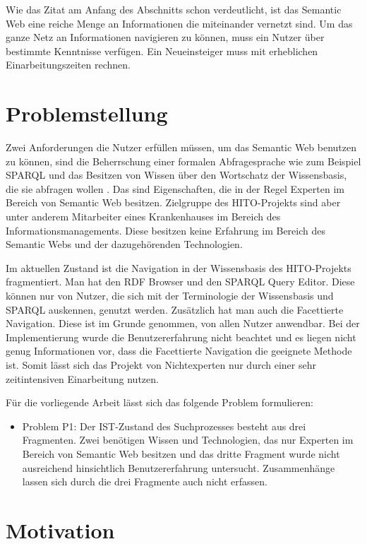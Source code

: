 Wie das Zitat am Anfang des Abschnitts schon verdeutlicht, ist das Semantic Web eine reiche Menge an Informationen die miteinander vernetzt sind. 
Um das ganze Netz an Informationen navigieren zu können, muss ein Nutzer über bestimmte Kenntnisse verfügen.
Ein Neueinsteiger muss mit erheblichen Einarbeitungszeiten rechnen.

\section{Problemstellung}\label{sec:problemstellung}

Zwei Anforderungen die Nutzer erfüllen müssen, um das Semantic Web benutzen zu können, sind die Beherrschung einer formalen Abfragesprache wie zum Beispiel \ac{SPARQL} und das Besitzen von Wissen über den Wortschatz der Wissensbasis, die sie abfragen wollen \citep[vgl.]{hoffner2017survey}. 
Das sind Eigenschaften, die in der Regel Experten im Bereich von Semantic Web besitzen. 
Zielgruppe des HITO-Projekts sind aber unter anderem Mitarbeiter eines Krankenhauses im Bereich des Informationsmanagements.
Diese besitzen keine Erfahrung im Bereich des Semantic Webs und der dazugehörenden Technologien.

Im aktuellen Zustand ist die Navigation in der Wissensbasis des HITO-Projekts fragmentiert. 
Man hat den RDF Browser und den SPARQL Query Editor. 
Diese können nur von Nutzer, die sich mit der Terminologie der Wissensbasis und SPARQL auskennen, genutzt werden. 
Zusätzlich hat man auch die Facettierte Navigation. 
Diese ist im Grunde genommen, von allen Nutzer anwendbar. 
Bei der Implementierung wurde die Benutzererfahrung nicht beachtet und es liegen nicht genug Informationen vor, dass die Facettierte Navigation die geeignete Methode ist.
Somit lässt sich das Projekt von Nichtexperten nur durch einer sehr zeitintensiven Einarbeitung nutzen. 

Für die vorliegende Arbeit lässt sich das folgende Problem formulieren:

\begin{itemize}
\item Problem P1: Der IST-Zustand des Suchprozesses besteht aus drei Fragmenten. 
Zwei benötigen Wissen und Technologien, das nur Experten im Bereich von Semantic Web besitzen und das dritte Fragment wurde nicht ausreichend hinsichtlich Benutzererfahrung untersucht.
Zusammenhänge lassen sich durch die drei Fragmente auch nicht erfassen.
\end{itemize}

\section{Motivation}\label{sec:motivation}

